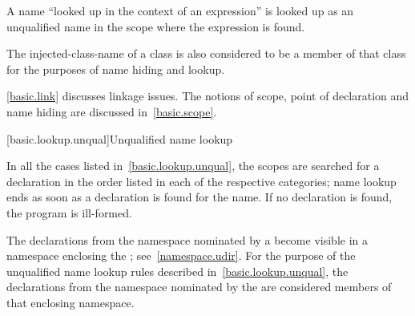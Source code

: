 \pnum
A name ``looked up in the context of an expression'' is looked up as an
unqualified name in the scope where the expression is found.

\pnum
The injected-class-name of a class is also
considered to be a member of that class for the purposes of name hiding
and lookup.

\pnum
\begin{note} \ref{basic.link} discusses linkage issues. The notions of
scope, point of declaration and name hiding are discussed
in~\ref{basic.scope}. \end{note}

[basic.lookup.unqual]{Unqualified name lookup}

\pnum
{}%
%
In all the cases listed in~\ref{basic.lookup.unqual}, the scopes are
searched for a declaration in the order listed in each of the respective
categories; name lookup ends as soon as a declaration is found for the
name. If no declaration is found, the program is ill-formed.

\pnum
The declarations from the namespace nominated by a
 become visible in a namespace enclosing the
; see~\ref{namespace.udir}. For the purpose of
the unqualified name lookup rules described
in~\ref{basic.lookup.unqual}, the declarations from the namespace
nominated by the  are considered members of
that enclosing namespace.


